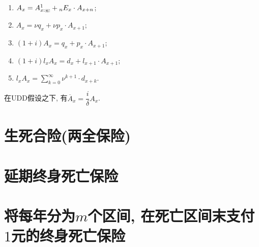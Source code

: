 \documentclass[lang=cn,10pt]{elegantbook}
\makeatletter
\DeclareRobustCommand{\annu}[1]{_{%
    \def\arraystretch{0}%
    \setlength\arraycolsep{1pt}%
    \setlength\arrayrulewidth{.2pt}%
    \begin{array}[b]{@{}c|}\hline
        \\[\arraycolsep]%
        \scriptstyle #1%
    \end{array}%
}}
\makeatother
\begin{document}
\begin{corollary}[精算现值的性质]
    \begin{enumerate}
        \item ${A}_x = {A}_{x:}^1{}_{\annu{n}} + {}_nE_{x}\cdot {A}_{x+n}$;
        \item ${A}_x = \nu q_x + \nu p_x\cdot {A}_{x+1};$
        \item $(1+i){A}_x = q_x + p_x\cdot {A}_{x+1};$
        \item $(1+i)l_x{A}_x = d_x + l_{x+1}\cdot {A}_{x+1};$
        \item $l_x{A}_x = \sum_{k=0}^{\infty }{\nu^{k+1}\cdot d_{x+k}}.$
    \end{enumerate}
\end{corollary}

\begin{proposition}
    在UDD假设之下, 有$\overline A_x=\dfrac{i}{\delta}A_x$.
\end{proposition}

\section{生死合险(两全保险)}

\section{延期终身死亡保险}

















\section{将每年分为$m$个区间, 在死亡区间末支付$1$元的终身死亡保险}
\end{document}
